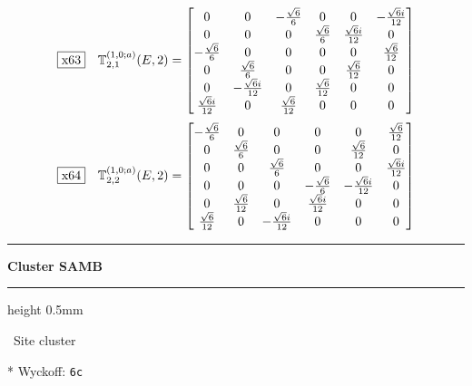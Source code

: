 \documentclass[fleqn,10pt,landscape]{jsarticle}
\begin{document}
\begin{dmath*}
\fbox{x63}\quad \mathbb{T}_{2,1}^{(1,0;a)}(E,2)=\begin{bmatrix} 0 & 0 & - \frac{\sqrt{6}}{6} & 0 & 0 & - \frac{\sqrt{6} i}{12} \\ 0 & 0 & 0 & \frac{\sqrt{6}}{6} & \frac{\sqrt{6} i}{12} & 0 \\ - \frac{\sqrt{6}}{6} & 0 & 0 & 0 & 0 & \frac{\sqrt{6}}{12} \\ 0 & \frac{\sqrt{6}}{6} & 0 & 0 & \frac{\sqrt{6}}{12} & 0 \\ 0 & - \frac{\sqrt{6} i}{12} & 0 & \frac{\sqrt{6}}{12} & 0 & 0 \\ \frac{\sqrt{6} i}{12} & 0 & \frac{\sqrt{6}}{12} & 0 & 0 & 0 \end{bmatrix}
\end{dmath*}
\begin{dmath*}
\fbox{x64}\quad \mathbb{T}_{2,2}^{(1,0;a)}(E,2)=\begin{bmatrix} - \frac{\sqrt{6}}{6} & 0 & 0 & 0 & 0 & \frac{\sqrt{6}}{12} \\ 0 & \frac{\sqrt{6}}{6} & 0 & 0 & \frac{\sqrt{6}}{12} & 0 \\ 0 & 0 & \frac{\sqrt{6}}{6} & 0 & 0 & \frac{\sqrt{6} i}{12} \\ 0 & 0 & 0 & - \frac{\sqrt{6}}{6} & - \frac{\sqrt{6} i}{12} & 0 \\ 0 & \frac{\sqrt{6}}{12} & 0 & \frac{\sqrt{6} i}{12} & 0 & 0 \\ \frac{\sqrt{6}}{12} & 0 & - \frac{\sqrt{6} i}{12} & 0 & 0 & 0 \end{bmatrix}
\end{dmath*}
\vspace{5mm}
\noindent \rule[0.5mm]{5mm}{0.5mm}\hspace{3mm}\textbf{Cluster SAMB}\hspace{3mm}\leaders\hrule height 0.5mm\hfill\kern0pt
\vspace{3mm}

\noindent\textbullet\, Site cluster

\vspace{5mm}

\noindent ** Wyckoff: \texttt{6c}
\end{document}

